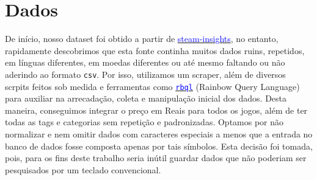 \documentclass[ecp,tc]{iiufrgs}
\begin{document}
% 

\chapter{Dados}
De início, nosso dataset foi obtido a partir de \href{https://github.com/NewbieIndieGameDev/steam-insights}{\textcolor{blue}{steam-insights}}, no entanto, rapidamente descobrimos que esta fonte continha muitos dados ruins, repetidos, em línguas diferentes, em moedas diferentes ou até mesmo faltando ou não aderindo ao formato \texttt{csv}. Por isso, utilizamos um scraper, além de diversos scrpits feitos sob medida e ferramentas como  \href{https://rbql.org/}{\textcolor{blue}{\texttt{rbql}}} (Rainbow Query Language) para auxiliar na arrecadação, coleta e manipulação inicial dos dados. Desta maneira, conseguimos integrar o preço em Reais para todos os jogos, além de ter todas as tags e categorias sem repetição e padronizadas. Optamos por não normalizar e nem omitir dados com caracteres especiais a menos que a entrada no banco de dados fosse composta apenas por tais símbolos. Esta decisão foi tomada, pois, para os fins deste trabalho seria inútil guardar dados que não poderiam ser pesquisados por um teclado convencional.
\end{document}

